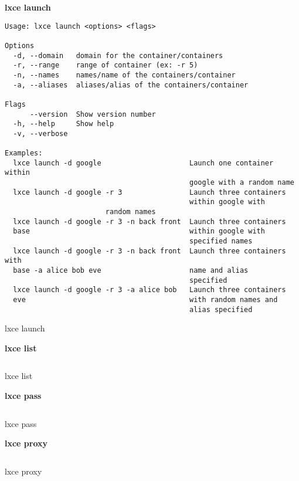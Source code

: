 \textbf{lxce launch}
\begin{listing}[H]
\begin{verbatim}
Usage: lxce launch <options> <flags>

Options
  -d, --domain   domain for the container/containers         
  -r, --range    range of container (ex: -r 5)             
  -n, --names    names/name of the containers/container                  
  -a, --aliases  aliases/alias of the containers/container               

Flags
      --version  Show version number                                   
  -h, --help     Show help                                             
  -v, --verbose

Examples:
  lxce launch -d google                     Launch one container within 
                                            google with a random name
  lxce launch -d google -r 3                Launch three containers 
                                            within google with 
					    random names
  lxce launch -d google -r 3 -n back front  Launch three containers 
  base                                      within google with 
                                            specified names
  lxce launch -d google -r 3 -n back front  Launch three containers with 
  base -a alice bob eve                     name and alias
                                            specified
  lxce launch -d google -r 3 -a alice bob   Launch three containers 
  eve                                       with random names and 
                                            alias specified
\end{verbatim}
\caption{lxce launch}
\label{listings: lxce launch}
\end{listing}

\textbf{lxce list}
\begin{listing}[H]
\begin{verbatim}
\end{verbatim}
\caption{lxce list}
\label{listings: lxce list}
\end{listing}

\textbf{lxce pass}
\begin{listing}[H]
\begin{verbatim}
\end{verbatim}
\caption{lxce pass}
\label{listings: lxce pass}
\end{listing}

\textbf{lxce proxy}
\begin{listing}[H]
\begin{verbatim}
\end{verbatim}
\caption{lxce proxy}
\label{listings: lxce proxy}
\end{listing}

